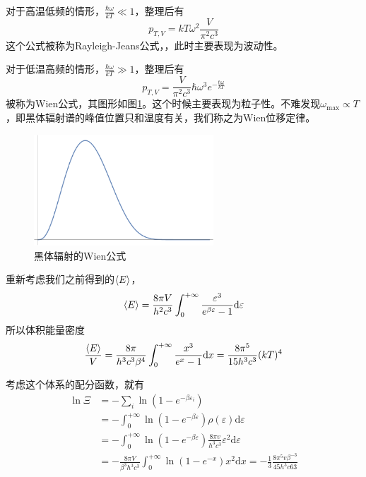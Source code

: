 对于高温低频的情形，$\displaystyle \frac{\hbar \omega}{kT}\ll 1$，整理后有\begin{equation}
    p_{T,V}=kT \omega^2 \frac{V}{\pi^2 c^3}
\end{equation}
这个公式被称为Rayleigh-Jeans公式，，此时主要表现为波动性。

对于低温高频的情形，$\displaystyle \frac{\hbar \omega}{kT}\gg 1$，整理后有\begin{equation}
    p_{T,V}=\frac{V}{\pi^2 c^3}\hbar \omega^3 e^{-\frac{\hbar \omega}{kT}}
\end{equation}
被称为Wien公式，其图形如图\ref{fig:wien equation}。这个时候主要表现为粒子性。不难发现$\omega_{\max}\propto T$，即黑体辐射谱的峰值位置只和温度有关，我们称之为Wien位移定律。
\begin{figure}[h]
       \centering
       \includegraphics[width=0.6\textwidth]{fig/wien.pdf}
       \caption{黑体辐射的Wien公式}
       \label{fig:wien equation}
\end{figure}

重新考虑我们之前得到的$\braket{E}$，\begin{equation}
    \braket{E} =\frac{8\pi V}{h^2 c^3} \int_0^{+\infty} \frac{\varepsilon^3}{e^{\beta \varepsilon}-1}\mathrm{d} \varepsilon
\end{equation}
所以体积能量密度\begin{equation}
    \frac{\braket{E}}{V} = \frac{8\pi}{h^3 c^3 \beta^4} \int_0^{+\infty} \frac{x^3}{e^x -1} \mathrm{d} x=\frac{8\pi^5}{15h^3 c^3} (kT)^4
\end{equation}

考虑这个体系的配分函数，就有\begin{equation}
\begin{aligned}
    \ln \Xi &=-\sum_i \ln\left(1-e^{-\beta\varepsilon_i}\right)\\
    &= -\int_{0}^{+\infty}\ln (1-e^{-\beta \varepsilon} ) \rho(\varepsilon) \mathrm{d}\varepsilon\\
    & = -\int_{0}^{+\infty} \ln (1-e^{-\beta \varepsilon} )  \frac{8\pi v}{h^3 c^3}\varepsilon^2\mathrm{d}\varepsilon\\
    & = -\frac{8\pi V}{\beta^3 h^3 c^3} \int_{0}^{+\infty}\ln(1-e^{-x})x^2  \mathrm{d}x=-\frac{1}{3} \frac{8\pi^5 v \beta^{-3}}{45 h^3 c63}
\end{aligned}
\end{equation}


